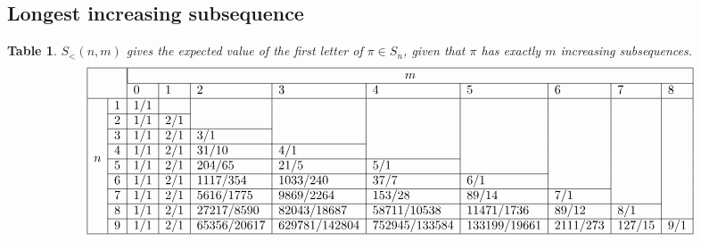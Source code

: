 \documentclass{article}
\newcommand{\n}[1]{\multicolumn{1}{|c|}{#1}}
\newtheorem{datatable}[theo]{Table}
\begin{document}
\subsection{Longest increasing subsequence}
\begin{datatable} $S_<(n, m)$ gives the expected value of the first letter of
  $\pi \in S_n$, given that $\pi$ has exactly $m$ increasing subsequences.
\[
  \begin{array}{|ll|l|l|l|l|l|l|l|l|l|}
  \hline
  & & \multicolumn{9}{|c|}{m} \\ \cline{3-11}
  & & 0 & 1 & 2 & 3 & 4 & 5 & 6 & 7 & 8\\ \hline
  \multirow{8}{*}{$n$}
  & \n1 & 1/1 &     &             &               &               &              &          &        &     \\ \cline{2-4}
  & \n2 & 1/1 & 2/1 &             &               &               &              &          &        &     \\ \cline{2-5}
  & \n3 & 1/1 & 2/1 & 3/1         &               &               &              &          &        &     \\ \cline{2-6}
  & \n4 & 1/1 & 2/1 & 31/10       & 4/1           &               &              &          &        &     \\ \cline{2-7}
  & \n5 & 1/1 & 2/1 & 204/65      & 21/5          & 5/1           &              &          &        &     \\ \cline{2-8}
  & \n6 & 1/1 & 2/1 & 1117/354    & 1033/240      & 37/7          & 6/1          &          &        &     \\ \cline{2-9}
  & \n7 & 1/1 & 2/1 & 5616/1775   & 9869/2264     & 153/28        & 89/14        & 7/1      &        &     \\ \cline{2-10}
  & \n8 & 1/1 & 2/1 & 27217/8590  & 82043/18687   & 58711/10538   & 11471/1736   & 89/12    & 8/1    &     \\ \cline{2-11}
  & \n9 & 1/1 & 2/1 & 65356/20617 & 629781/142804 & 752945/133584 & 133199/19661 & 2111/273 & 127/15 & 9/1 \\ \hline
  \end{array}
\]
\end{datatable}
\end{document}
